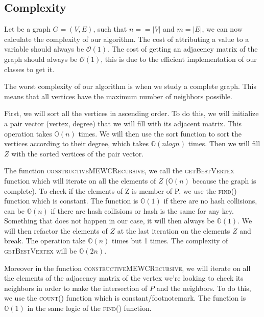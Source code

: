 
\subsection{Complexity}

Let be a graph $G = (V,E)$, such that $n = =|V|$ and $m = |E|$, we can now calculate the complexity of our algorithm. The cost of attributing a value to a variable should always be $\mathcal{O}(1)$. The cost of getting an adjacency matrix of the graph should always be $\mathcal{O}(1)$, this is due to the efficient implementation of our classes to get it.
\bigskip

The worst complexity of our algorithm is when we study a complete graph. This means that all vertices have the maximum number of neighbors possible.
\bigskip

First, we will sort all the vertices in ascending order. To do this, we will initialize a pair vector (vertex, degree) that we will fill with its adjacent matrix. This operation takes $\mathbb{O}(n)$ times. We will then use the sort function to sort the vertices according to their degree, which takes $\mathbb{O}(nlogn)$ times\footnotemark. Then we will fill $Z$ with the sorted vertices of the pair vector.
\bigskip

The function \textsc{constructiveMEWCRecursive}, we call the \textsc{getBestVertex} function which will iterate on all the elements of $Z$ ($\mathbb{O}(n)$ because the graph is complete). To check if the elements of Z is member of P, we use the \textsc{find()} function which is constant\footnotemark. The function is $\mathbb{O}(1)$ if there are no hash collisions, can be $\mathbb{O}(n)$ if there are hash collisions or hash is the same for any key. Something that does not happen in our case, it will then always be $\mathbb{O}(1)$. We will then refactor the elements of $Z$ at the last iteration on the elements $Z$ and break. The operation take $\mathbb{O}(n)$ times but 1 times. The complexity of \textsc{getBestVertex} will be $\mathbb{O}(2n)$. 
\bigskip

Moreover in the function \textsc{constructiveMEWCRecursive}, we will iterate on all the elements of the adjacency matrix of the vertex we're looking to check its neighbors in order to make the intersection of $P$ and the neighbors. To do this, we use the \textsc{count()} function which is constant/footnotemark. The function is $\mathbb{O}(1)$ in the same logic of the \textsc{find()} function.
\bigskip

